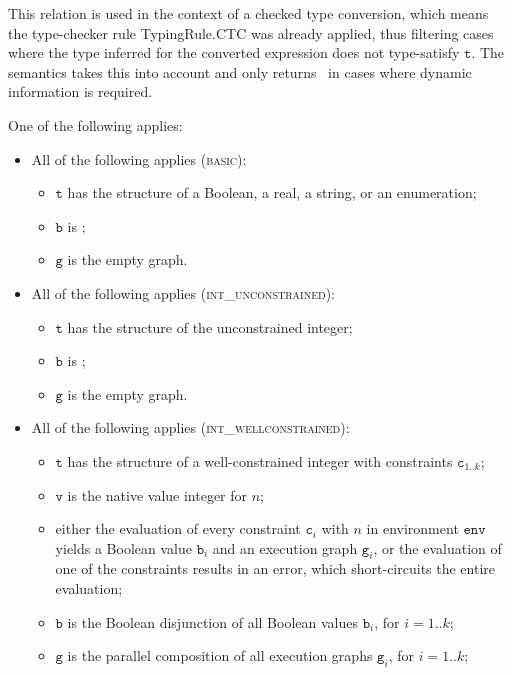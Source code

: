 \documentclass{book}
\newcommand\env[0]{\texttt{env}}
\newcommand\vc[0]{\texttt{c}}
\newcommand\vg[0]{\texttt{g}}
\newcommand\vv[0]{\texttt{v}}
\newcommand\vt[0]{\texttt{t}}
\newcommand\vb[0]{\texttt{b}}
\begin{document}
This relation is used in the context of a checked type conversion,
which means the type-checker rule TypingRule.CTC was already applied,
thus filtering cases where the type inferred for the converted expression
does not type-satisfy $\vt$. The semantics takes this into account and
only returns \False\ in cases where dynamic information is required.

One of the following applies:
\begin{itemize}
  \item All of the following applies (\textsc{basic}):
  \begin{itemize}
    \item $\vt$ has the structure of a Boolean, a real, a string, or an enumeration;
    \item $\vb$ is \True;
    \item $\vg$ is the empty graph.
  \end{itemize}

  \item All of the following applies (\textsc{int\_unconstrained}):
  \begin{itemize}
    \item $\vt$ has the structure of the unconstrained integer;
    \item $\vb$ is \True;
    \item $\vg$ is the empty graph.
  \end{itemize}

  \item All of the following applies (\textsc{int\_wellconstrained}):
  \begin{itemize}
    \item $\vt$ has the structure of a well-constrained integer with constraints $\vc_{1..k}$;
    \item $\vv$ is the native value integer for $n$;
    \item either the evaluation of every constraint $\vc_i$ with $n$ in environment $\env$
    yields a Boolean value $\vb_i$ and an execution graph $\vg_i$,
    or the evaluation of one of the constraints results in an error, which short-circuits the entire
    evaluation;
    \item $\vb$ is the Boolean disjunction of all Boolean values $\vb_i$, for $i=1..k$;
    \item $\vg$ is the parallel composition of all execution graphs $\vg_i$, for $i=1..k$;
  \end{itemize}


\end{itemize}
\end{document}
